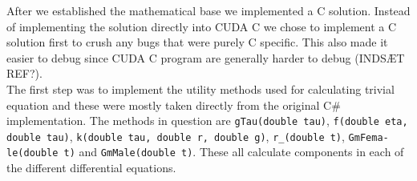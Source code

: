 
After we established the mathematical base we implemented a C solution. Instead of implementing the solution directly into CUDA C we chose to implement a C solution first to crush any bugs that were purely C specific. This also made it easier to debug since CUDA C program are generally harder to debug (INDSÆT REF?). \\

The first step was to implement the utility methods used for calculating trivial equation and these were mostly taken directly from the original C\# implementation. The methods in question are \texttt{gTau(double tau)}, \texttt{f(double eta, double tau)}, \texttt{k(double tau, double r, double g)}, \texttt{r\_(double t)}, \texttt{GmFema-\\le(double t)} and \texttt{GmMale(double t)}. These all calculate components in each of the different differential equations.

